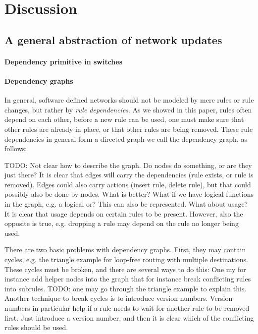 \section{Discussion}
\label{sec:discussion}

\subsection{A general abstraction of network updates}

\paragraph{Dependency primitive in switches}

\paragraph{Dependency graphs}

In general, software defined networks should not be modeled by mere rules or rule changes, but rather by \emph{rule dependencies}. As we showed in this paper, rules often depend on each other, before a new rule can be used, one must make sure that other rules are already in place, or that other rules are being removed. These rule dependencies in general form a directed graph we call the dependency graph, as follows:

TODO: Not clear how to describe the graph. Do nodes do something, or are they just there? It is clear that edges will carry the dependencies (rule exists, or rule is removed). Edges could also carry actions (insert rule, delete rule), but that could possibly also be done by nodes. What is better? What if we have logical functions in the graph, e.g. a logical or? This can also be represented. What about usage? It is clear that usage depends on certain rules to be present. However, also the opposite is true, e.g. dropping a rule may depend on the rule no longer being used.

There are two basic problems with dependency graphs. First, they may contain cycles, e.g. the triangle example for loop-free routing with multiple destinations. These cycles must be broken, and there are several ways to do this: One my for instance add helper nodes into the graph that for instance break conflicting rules into subrules. TODO: one may go through the triangle example to explain this. Another technique to break cycles is to introduce version numbers. Version numbers in particular help if a rule needs to wait for another rule to be removed first. Just introduce a version number, and then it is clear which of the conflicting rules should be used.

